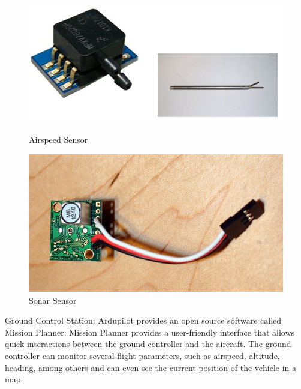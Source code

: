 \documentclass[english,fira]{ist-report}
\begin{document}
\begin{figure}[h]
  \centering
  \begin{minipage}[t]{0.5\linewidth}
    \centering
    \includegraphics[width=\textwidth]{graphics/AVIONICS/ardupilot3.png}
    \caption{Airspeed Sensor}
    \label{fig:ardupilot_AirspeedSensor}
  \end{minipage}%
  \begin{minipage}[t]{0.5\linewidth}
    \centering
    \includegraphics[width=\textwidth]{graphics/AVIONICS/ardupilot4.png}
    \caption{Sonar Sensor}
    \label{fig:ardupilot_SonarSensor}
  \end{minipage}
\end{figure}

Ground Control Station: Ardupilot provides an open source software called Mission Planner. Mission Planner provides a user-friendly interface that allows quick interactions between the ground controller and the aircraft. The ground controller can monitor several flight parameters, such as airspeed, altitude, heading, among others and can even see the current position of the vehicle in a map.
\end{document}
